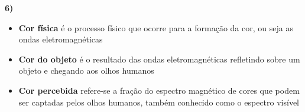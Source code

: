 \textbf{6)} 

\begin{itemize}
	\item \textbf{Cor física} é o processo físico que ocorre para a 
	formação da cor, ou seja as ondas eletromagnéticas
	
	\item \textbf{Cor do objeto} é o resultado das ondas eletromagnéticas 
	refletindo sobre um objeto e chegando aos olhos humanos
	
	\item \textbf{Cor percebida} refere-se a fração do espectro magnético de
	cores que podem ser captadas pelos olhos humanos, também conhecido como 
	o espectro visível
\end{itemize}